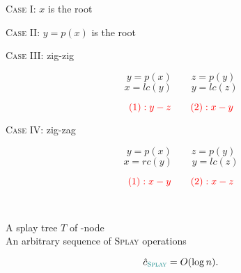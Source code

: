 \begin{frame}{}

  \vspace{0.30cm}
  \centerline{\textsc{Case I}: $x$ is the root}
\end{frame}

\begin{frame}{}

  \vspace{0.30cm}
  \centerline{\textsc{Case II}: $y = p(x)$ is the root}
\end{frame}

\begin{frame}{}

  \vspace{0.30cm}
  \centerline{\textsc{Case III}: zig-zig}
  \[
    y = p(x) \qquad z = p(y)
  \]
  \[
    x = lc(y) \qquad y = lc(z)
  \]

  \pause
  \[
    \textcolor{red}{(1): y - z \qquad (2): x - y}
  \]
\end{frame}

\begin{frame}{}

  \vspace{0.30cm}
  \centerline{\textsc{Case IV}: zig-zag}
  \[
    y = p(x) \qquad z = p(y)
  \]
  \[
    x = rc(y) \qquad y = lc(z)
  \]

  \pause
  \[
    \textcolor{red}{(1): x - y \qquad (2): x - z}
  \]
\end{frame}

\begin{frame}{}

  \pause
\end{frame}

\begin{frame}{}
  \begin{center}
     \\[30pt] \pause

    A splay tree $T$ of -node \\[6pt]
    An arbitrary sequence of  \textsc{Splay} operations
  \end{center}

  \pause
  \vspace{0.50cm}
  \begin{theorem}
    \[
      \hat{c}_{\textsc{\textcolor{teal}{Splay}}} = O(\log n).
    \]
  \end{theorem}
\end{frame}

